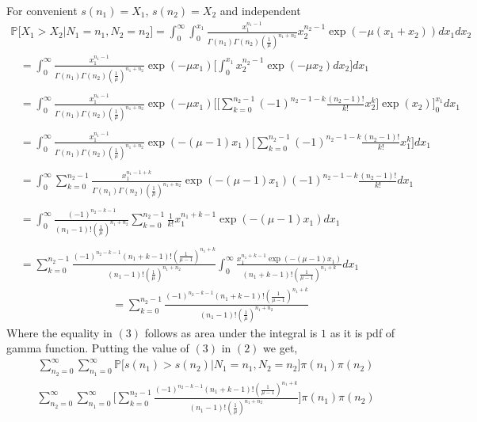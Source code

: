 \documentclass[a4paper,english,12pt]{article}
\begin{document}
For convenient $s(n_1) = X_1$, $s(n_2) = X_2$ and independent
\begin{align*}
\mathbb{P}\bigg[X_1 > X_2 | N_1 =n_1, N_2 =n_2\bigg]= \int_{0}^{\infty}\int_{0}^{x_1}\frac{x_1^{n_1-1}}{\Gamma(n_1) \Gamma(n_2)(\frac{1}{\mu})^{n_1 + n_2}}x_2^{n_2-1}\exp(-\mu(x_1+x_2))dx_1 dx_2
\end{align*}
\begin{align*}
&=\int_{0}^{\infty}\frac{x_1^{n_1-1}}{\Gamma(n_1) \Gamma(n_2)(\frac{1}{\mu})^{n_1 + n_2}}\exp(-\mu x_1)\Bigg[\int_{0}^{x_1}x_2^{n_2-1}\exp(-\mu x_2)dx_2\Bigg]dx_1\\\\
&=\int_{0}^{\infty}\frac{x_1^{n_1-1}}{\Gamma(n_1) \Gamma(n_2)(\frac{1}{\mu})^{n_1 + n_2}}\exp(-\mu x_1)\Biggl[\Bigg[\sum_{k=0}^{n_2-1}(-1)^{n_2-1-k}\frac{(n_2-1)!}{k!}x_2^k\Bigg]\exp(x_2)\Biggl]_0^{x_1}dx_1\\\\
&=\int_{0}^{\infty}\frac{x_1^{n_1-1}}{\Gamma(n_1) \Gamma(n_2)(\frac{1}{\mu})^{n_1 + n_2}}\exp(-(\mu-1) x_1)\Bigg[\sum_{k=0}^{n_2-1}(-1)^{n_2-1-k}\frac{(n_2-1)!}{k!}x_1^k\Bigg]dx_1\\\\
&=\int_{0}^{\infty}\sum_{k=0}^{n_2-1}\frac{x_1^{n_1-1+k}}{\Gamma(n_1) \Gamma(n_2)(\frac{1}{\mu})^{n_1 + n_2}}\exp(-(\mu-1) x_1)(-1)^{n_2-1-k}\frac{(n_2-1)!}{k!} dx_1\\\\
&=\int_{0}^{\infty}\frac{(-1)^{n_2-k-1}}{(n_1-1)!(\frac{1}{\mu})^{n_1+   n_2}}\sum_{k=0}^{n_2-1}\frac{1}{k!} x_1^{n_1+k-1} \exp(-(\mu-1)x_1)dx_1\\\\
&=\sum_{k=0}^{n_2-1}\frac{(-1)^{n_2-k-1}(n_1+k-1)!(\frac{1}{\mu-1})^{n_1+k}}{(n_1-1)!(\frac{1}{\mu})^{n_1+   n_2}}\int_{0}^{\infty}\frac{x_1^{n_1+k-1} \exp(-(\mu-1)x_1)}{(n_1+k-1)!(\frac{1}{\mu-1})^{n_1+k}} dx_1
\end{align*}
\begin{align}
&=\sum_{k=0}^{n_2-1}\frac{(-1)^{n_2-k-1}(n_1+k-1)!(\frac{1}{\mu-1})^{n_1+k}}{(n_1-1)!(\frac{1}{\mu})^{n_1+   n_2}}
\end{align}
Where the equality in $(3)$ follows as area under the integral is $1$ as it is pdf of gamma function.
Putting the value of $(3)$ in $(2)$ we get,
\begin{align*}
 \sum_{n_2=0}^{\infty}\sum_{n_1=0}^{\infty} \mathbb{P}\bigg[s(n_1) > s(n_2) | N_1 =n_1, N_2 =n_2\bigg] \pi(n_1) \pi(n_2)
 \end{align*}
 \begin{align*}
  \sum_{n_2=0}^{\infty}\sum_{n_1=0}^{\infty} \bigg[\sum_{k=0}^{n_2-1}\frac{(-1)^{n_2-k-1}(n_1+k-1)!(\frac{1}{\mu-1})^{n_1+k}}{(n_1-1)!(\frac{1}{\mu})^{n_1+   n_2}} \bigg] \pi(n_1) \pi(n_2)
\end{align*}
\end{document}
